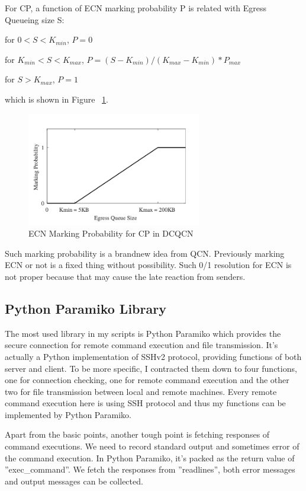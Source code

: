\documentclass[12pt,a4paper]{article}
\begin{document}
For CP, a function of ECN marking probability P is related with Egress Queueing size S:

for $0<S<K_{min}$, $P = 0$

for $K_{min}<S<K_{max}$, $P = (S - K_{min})/(K_{max} - K_{min})*P_{max}$

for $S>K_{max}$, $P = 1$

which is shown in Figure ~\ref{fig:ECNMarking}.

\begin{figure}[ht]
	\begin{center}
		\includegraphics[width=3in]{ECNMarking}
		\caption{ECN Marking Probability for CP in DCQCN}
		\label{fig:ECNMarking}
	\end{center}
\end{figure}

Such marking probability is a brandnew idea from QCN.
Previously marking ECN or not is a fixed thing without possibility.
Such 0/1 resolution for ECN is not proper because that may cause the late reaction from senders.

\subsection{Python Paramiko Library}

The most used library in my scripts is Python Paramiko
which provides the secure connection for remote command execution and file transmission.
It's actually a Python implementation of SSHv2 protocol, providing functions of both server and client.
To be more specific, I contracted them down to four functions, one for connection checking,
one for remote command execution and the other two for file transmission between local and remote machines.
Every remote command execution here is using SSH protocol and thus my functions can be implemented by Python Paramiko.

Apart from the basic points, another tough point is fetching responses of command executions.
We need to record standard output and sometimes error of the command execution.
In Python Paramiko, it's packed as the return value of ''exec\_command''.
We fetch the responses from ''readlines'', both error messages and output messages can be collected.
\end{document}
